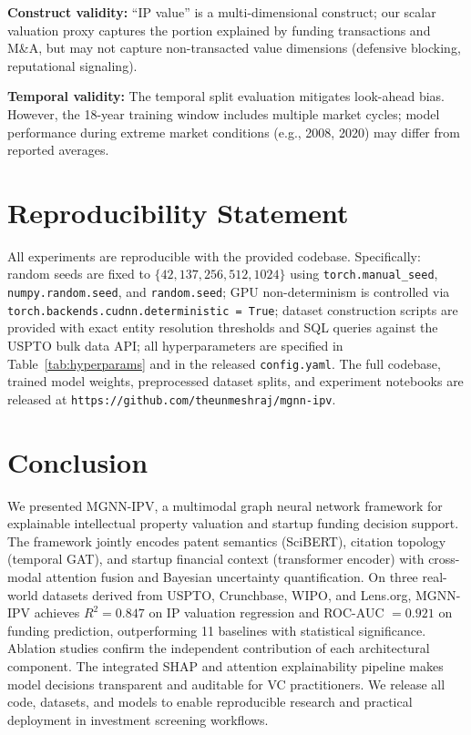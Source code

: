 \documentclass[journal]{IEEEtran}
\begin{document}
\textbf{Construct validity:} ``IP value'' is a multi-dimensional construct; our scalar valuation proxy captures the portion explained by funding transactions and M\&A, but may not capture non-transacted value dimensions (defensive blocking, reputational signaling).

\textbf{Temporal validity:} The temporal split evaluation mitigates look-ahead bias. However, the 18-year training window includes multiple market cycles; model performance during extreme market conditions (e.g., 2008, 2020) may differ from reported averages.

\section{Reproducibility Statement}

All experiments are reproducible with the provided codebase. Specifically: random seeds are fixed to $\{42, 137, 256, 512, 1024\}$ using \texttt{torch.manual\_seed}, \texttt{numpy.random.seed}, and \texttt{random.seed}; GPU non-determinism is controlled via \texttt{torch.backends.cudnn.deterministic = True}; dataset construction scripts are provided with exact entity resolution thresholds and SQL queries against the USPTO bulk data API; all hyperparameters are specified in Table~\ref{tab:hyperparams} and in the released \texttt{config.yaml}. The full codebase, trained model weights, preprocessed dataset splits, and experiment notebooks are released at \texttt{https://github.com/theunmeshraj/mgnn-ipv}.

\section{Conclusion}

We presented MGNN-IPV, a multimodal graph neural network framework for explainable intellectual property valuation and startup funding decision support. The framework jointly encodes patent semantics (SciBERT), citation topology (temporal GAT), and startup financial context (transformer encoder) with cross-modal attention fusion and Bayesian uncertainty quantification. On three real-world datasets derived from USPTO, Crunchbase, WIPO, and Lens.org, MGNN-IPV achieves $R^2 = 0.847$ on IP valuation regression and ROC-AUC $= 0.921$ on funding prediction, outperforming 11 baselines with statistical significance. Ablation studies confirm the independent contribution of each architectural component. The integrated SHAP and attention explainability pipeline makes model decisions transparent and auditable for VC practitioners. We release all code, datasets, and models to enable reproducible research and practical deployment in investment screening workflows.
\end{document}
